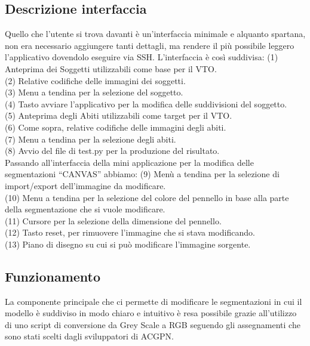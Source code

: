 \documentclass[final, 11pt]{article}
\begin{document}
	\subsection{Descrizione interfaccia}
	Quello che l’utente si trova davanti è un’interfaccia minimale e alquanto spartana, non era necessario aggiungere tanti dettagli, ma rendere il più possibile leggero l’applicativo dovendolo eseguire via SSH.
	L’interfaccia è così suddivisa:
\newline
	(1) Anteprima dei Soggetti utilizzabili come base per il VTO.
\\
	(2) Relative codifiche delle immagini dei soggetti.
\\
	(3) Menu a tendina per la selezione del soggetto. 
\\
	(4) Tasto avviare l’applicativo per la modifica delle suddivisioni del soggetto. 
\\
	(5) Anteprima degli Abiti utilizzabili come target per il VTO. 
\\
	(6) Come sopra, relative codifiche delle immagini degli abiti. \\
	(7) Menu a tendina per la selezione degli abiti.
\\
	(8) Avvio del file di test.py per la produzione del risultato. 
\\
	
	
	
	Passando all’interfaccia della mini applicazione per la modifica delle segmentazioni “CANVAS” abbiamo:
\newline
	(9) Menù a tendina per la selezione di import/export dell’immagine da modificare. \\
	(10) Menu a tendina per la selezione del colore del pennello in base alla parte della segmentazione che si vuole modificare. 
\\
	(11) Cursore per la selezione della dimensione del pennello. 
\\
	(12) Tasto reset, per rimuovere l’immagine che si stava modificando. \\
	(13) Piano di disegno su cui si può modificare l’immagine sorgente.
\\
	
	\subsection{Funzionamento}
	La componente principale che ci permette di modificare le segmentazioni in cui il modello è suddiviso in modo chiaro e intuitivo è resa possibile grazie all’utilizzo di uno script di conversione da Grey Scale a RGB seguendo gli assegnamenti che sono stati scelti dagli sviluppatori di ACGPN. 
	
\end{document}
